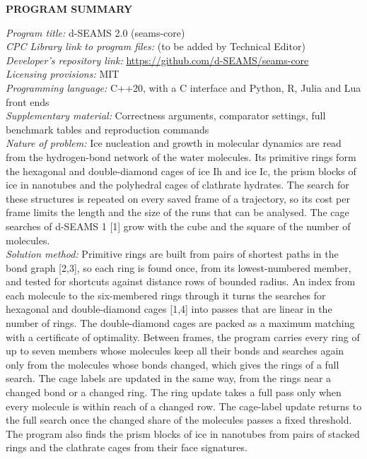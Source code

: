 \documentclass[preprint,12pt]{elsarticle}
\begin{document}
\noindent\textbf{PROGRAM SUMMARY}

\begin{small}
\noindent
{\em Program title:} d-SEAMS 2.0 (seams-core)\\
{\em CPC Library link to program files:} (to be added by Technical Editor)\\
{\em Developer's repository link:} \url{https://github.com/d-SEAMS/seams-core}\\
{\em Licensing provisions:} MIT\\
{\em Programming language:} C++20, with a C interface and Python, R, Julia and Lua front ends\\
{\em Supplementary material:} Correctness arguments, comparator settings, full benchmark tables and reproduction commands\\
{\em Nature of problem:}
Ice nucleation and growth in molecular dynamics are read from the hydrogen-bond network of the water molecules.
Its primitive rings form the hexagonal and double-diamond cages of ice Ih and ice Ic, the prism blocks of ice in nanotubes and the polyhedral cages of clathrate hydrates.
The search for these structures is repeated on every saved frame of a trajectory, so its cost per frame limits the length and the size of the runs that can be analysed.
The cage searches of d-SEAMS 1 [1] grow with the cube and the square of the number of molecules.\\
{\em Solution method:}
Primitive rings are built from pairs of shortest paths in the bond graph [2,3], so each ring is found once, from its lowest-numbered member, and tested for shortcuts against distance rows of bounded radius.
An index from each molecule to the six-membered rings through it turns the searches for hexagonal and double-diamond cages [1,4] into passes that are linear in the number of rings.
The double-diamond cages are packed as a maximum matching with a certificate of optimality.
Between frames, the program carries every ring of up to seven members whose molecules keep all their bonds and searches again only from the molecules whose bonds changed, which gives the rings of a full search.
The cage labels are updated in the same way, from the rings near a changed bond or a changed ring.
The ring update takes a full pass only when every molecule is within reach of a changed row.
The cage-label update returns to the full search once the changed share of the molecules passes a fixed threshold.
The program also finds the prism blocks of ice in nanotubes from pairs of stacked rings and the clathrate cages from their face signatures.\\

\end{small}
\end{document}

